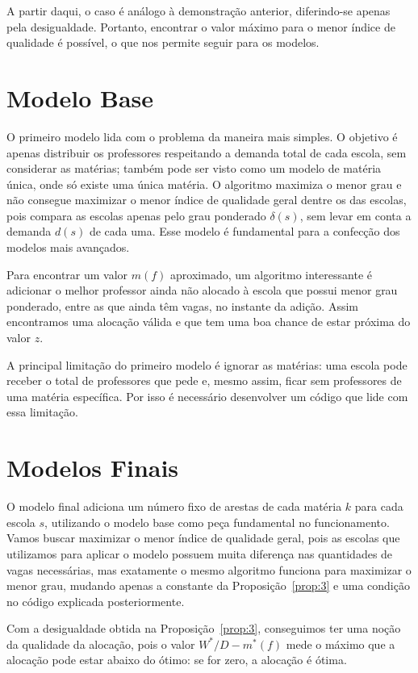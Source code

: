 \documentclass[12pt,a4paper]{article}
\begin{document}
A partir daqui, o caso é análogo à demonstração anterior, diferindo-se apenas pela desigualdade. Portanto, encontrar o valor máximo para o menor índice de qualidade é possível, o que nos permite seguir para os modelos.

\section{Modelo Base}

O primeiro modelo lida com o problema da maneira mais simples. O objetivo é apenas distribuir os professores respeitando a demanda total de cada escola, sem considerar as matérias; também pode ser visto como um modelo de matéria única, onde só existe uma única matéria. O algoritmo maximiza o menor grau e não consegue maximizar o menor índice de qualidade geral dentre os das escolas, pois compara as escolas apenas pelo grau ponderado $\delta(s)$, sem levar em conta a demanda $d(s)$ de cada uma. Esse modelo é fundamental para a confecção dos modelos mais avançados.

Para encontrar um valor $m(f)$ aproximado, um algoritmo interessante é adicionar o melhor professor ainda não alocado à escola que possui menor grau ponderado, entre as que ainda têm vagas, no instante da adição. Assim encontramos uma alocação válida e que tem uma boa chance de estar próxima do valor $z$.

A principal limitação do primeiro modelo é ignorar as matérias: uma escola pode receber o total de professores que pede e, mesmo assim, ficar sem professores de uma matéria específica. Por isso é necessário desenvolver um código que lide com essa limitação.

\section{Modelos Finais}

O modelo final adiciona um número fixo de arestas de cada matéria $k$ para cada escola $s$, utilizando o modelo base como peça fundamental no funcionamento. Vamos buscar maximizar o menor índice de qualidade geral, pois as escolas que utilizamos para aplicar o modelo possuem muita diferença nas quantidades de vagas necessárias, mas exatamente o mesmo algoritmo funciona para maximizar o menor grau, mudando apenas a constante da Proposição~\ref{prop:3} e uma condição no código explicada posteriormente.

Com a desigualdade obtida na Proposição~\ref{prop:3}, conseguimos ter uma noção da qualidade da alocação, pois o valor $W^*/D - m^*(f)$ mede o máximo que a alocação pode estar abaixo do ótimo: se for zero, a alocação é ótima.
\end{document}
